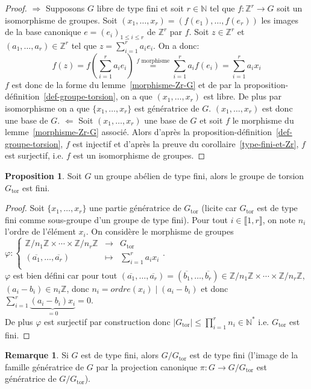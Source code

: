 \documentclass{report}
\newcommand{\Z}{\mathbb{Z}}
\newcommand{\N}{\mathbb{N}}
\newcommand{\Gt}{G_{\mathrm{tor}}}
\newcommand{\direct}{\textcircled{$\Rightarrow$} }
\newcommand{\reciproque}{\textcircled{$\Leftarrow$} }
\newcommand{\dis}{\displaystyle}
\newcommand{\nt}[1]{\llbracket  #1 \rrbracket }
\theoremstyle{definition}
\newtheorem{prop}[defi]{Proposition}
\newtheorem{rem}[defi]{Remarque}
\newcommand{\app}[5]{#1:\left\{\begin{array}{ccl}
#2 & \longrightarrow & #3 \\
#4 & \longmapsto & #5  \\
\end{array}\right.
}
\begin{document}
\begin{proof}
\direct Supposons $G$ libre de type fini et soit $r\in\N$ tel que $f:\Z^r\to G$ soit un isomorphisme de groupes. Soit $(x_1, \ldots ,x_r)=(f(e_1),\ldots, f(e_r))$ les images de la base canonique $e=(e_i)_{1\leqslant i\leqslant r}$ de $\Z^r$ par $f$. Soit $z\in\Z^r$ et $(a_1,\ldots,a_r)\in\Z^r$ tel que $z=\dis\sum_{i=1}^r a_ie_i$. On a donc:
$$f(z)=f(\dis\sum_{i=1}^r a_i e_i)\stackrel{\textrm{$f$ morphisme}}{=}\dis\sum_{i=  1}^r a_if(e_i)=\dis\sum_{i=  1}^r a_ix_i$$
$f$ est donc de la forme du lemme~\ref{morphisme-Zr-G} et de par la proposition-d\'efinition~\ref{def-groupe-torsion}, on a que $(x_1, \ldots ,x_r)$ est libre. De plus par isomorphisme on a que $\{x_1, \ldots ,x_r\}$ est génératrice de $G$. $(x_1, \ldots ,x_r)$ est donc une base de $G$.\bigbreak
\reciproque Soit $(x_1, \ldots ,x_r)$ une base de $G$ et soit $f$ le morphisme du lemme~\ref{morphisme-Zr-G} associ\'e. Alors d'apr\`es la proposition-d\'efinition~\ref{def-groupe-torsion}, $f$ est injectif et d'apr\`es la preuve du corollaire~\ref{type-fini-et-Zr}, $f$ est surjectif, i.e. $f$ est un isomorphisme de groupes.
\end{proof}

\begin{prop}
Soit $G$ un groupe abélien de type fini, alors le groupe de torsion $\Gt$ est fini.
\end{prop}

\begin{proof}
Soit $\{x_1, \ldots ,x_r\}$ une partie génératrice de $\Gt$ (licite car $\Gt$ est de type fini comme sous-groupe d'un groupe de type fini). Pour tout $i \in \nt{1,r}$, on note $n_i$ l'ordre de l'élément $x_i$. On considère le morphisme de groupes $\app{\varphi}{\Z/n_1\Z \times \cdots \times \Z/n_r\Z}{\Gt}{(\overline{a_1}, \ldots, \overline{a_r})}{\dis \sum_{i=1}^r a_ix_i}$.\\
$\varphi$ est bien défini car pour tout $(\overline{a_1}, \ldots, \overline{a_r})=(\overline{b_1}, \ldots, \overline{b_r}) \in \Z/n_1\Z \times \cdots \times \Z/n_r\Z$, $(a_i-b_i)\in n_i\Z$, donc $n_i=ordre(x_i)\mid (a_i-b_i)$ et donc $\dis \sum_{i=1}^r \underbrace{(a_i-b_i)x_i}_{=0}=0$.\\
De plus $\varphi$ est surjectif par construction  donc $\vert \Gt \vert \leqslant \dis \prod_{i=1}^r n_i \in \N^*$ i.e. $\Gt$ est fini.
\end{proof}

\begin{rem}
Si $G$ est de type fini, alors $G/\Gt$ est de type fini (l'image de la famille g\'en\'eratrice de $G$ par la projection canonique $\pi:G\to G/\Gt$ est g\'en\'eratrice de $G/\Gt$).
\end{rem}
\end{document}
